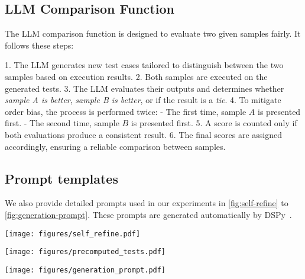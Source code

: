 \subsection{LLM Comparison Function}
\label{sec:llm_comparison}

The LLM comparison function is designed to evaluate two given samples fairly. It follows these steps:

1. The LLM generates new test cases tailored to distinguish between the two samples based on execution results.
2. Both samples are executed on the generated tests.
3. The LLM evaluates their outputs and determines whether \textit{sample A is better}, \textit{sample B is better}, or if the result is a \textit{tie}.
4. To mitigate order bias, the process is performed twice:
   - The first time, sample \( A \) is presented first.
   - The second time, sample \( B \) is presented first.
5. A score is counted only if both evaluations produce a consistent result.
6. The final scores are assigned accordingly, ensuring a reliable comparison between samples.
\fi

\subsection{Prompt templates}
\label{sec:appendix_prompts}
We also provide detailed prompts used in our experiments in \cref{fig:self-refine} to \cref{fig:generation-prompt}. These prompts are generated automatically by DSPy~\citep{khattab2023dspy}.

\begin{figure*}[t]
\centering
\texttt{[image: figures/self\_refine.pdf]}
\caption{The prompt for iterative debugging.}
\label{fig:self-refine}
\end{figure*}

\begin{figure*}[t]
\centering
\texttt{[image: figures/precomputed\_tests.pdf]}
\caption{The prompt for generating test cases.}
\end{figure*}

\begin{figure*}[t]
\centering
\texttt{[image: figures/generation\_prompt.pdf]}
\caption{The prompt for code generation.}
\label{fig:generation-prompt}
\end{figure*}